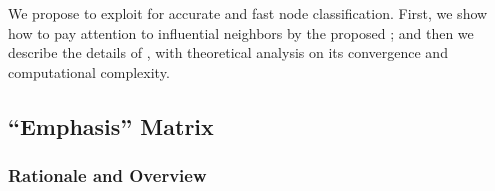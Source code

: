 



We propose \methodexp to exploit \nef for accurate and fast node classification.
First, we show how to pay attention to influential neighbors by the proposed \emphasis;
and then we describe the details of \methodexp,
with theoretical analysis on its convergence and computational complexity.

\subsection{``Emphasis'' Matrix} \label{ssec:att}

\subsubsection{Rationale and Overview}

